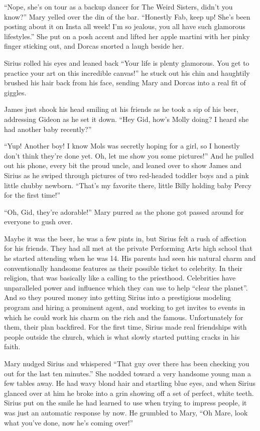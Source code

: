 \documentclass[12pt,twoside,openright]{memoir}
\begin{document}
``Nope, she's on tour as a backup dancer for The Weird Sisters, didn't you know?'' Mary yelled over the din of the bar.
``Honestly Fab, keep up! She's been posting about it on Insta all week! I'm so jealous, you all have such glamorous lifestyles.'' She put on a posh accent and lifted her apple martini with her pinky finger sticking out, and Dorcas snorted a laugh beside her. 

Sirius rolled his eyes and leaned back ``Your life is plenty glamorous. You get to practice your art on this incredible canvas!'' he stuck out his chin and haughtily brushed his hair back from his face, sending Mary and Dorcas into a real fit of giggles. 

James just shook his head smiling at his friends as he took a sip of his beer, addressing Gideon as he set it down. ``Hey Gid, how's Molly doing? I heard she had another baby recently?'' 

``Yup! Another boy! I know Mols was secretly hoping for a girl, so I honestly don't think they're done yet. Oh, let me show you some pictures!'' And he pulled out his phone, every bit the proud uncle, and leaned over to show James and Sirius as he swiped through pictures of two red-headed toddler boys and a pink little chubby newborn. ``That's my favorite there, little Billy holding baby Percy for the first time!'' 

``Oh, Gid, they're adorable!'' Mary purred as the phone got passed around for everyone to gush over. 

Maybe it was the beer, he was a few pints in, but Sirius felt a rush of affection for his friends. They had all met at the private Performing Arts high school that he started attending when he was 14. His parents had seen his natural charm and conventionally handsome features as their possible ticket to celebrity. In their religion, that was basically like a calling to the priesthood. Celebrities have unparalleled power and influence which they can use to help ``clear the planet''. And so they poured money into getting Sirius into a prestigious modeling program and hiring a prominent agent, and working to get invites to events in which he could work his charm on the rich and the famous. Unfortunately for them, their plan backfired. For the first time, Sirius made real friendships with people outside the church, which is what slowly started putting cracks in his faith. 

Mary nudged Sirius and whispered ``That guy over there has been checking you out for the last ten minutes.'' She nodded toward a very handsome young man a few tables away. He had wavy blond hair and startling blue eyes, and when Sirius glanced over at him he broke into a grin showing off a set of perfect, white teeth. Sirius put on the smile he had learned to use when trying to impress people, it was just an automatic response by now. He grumbled to Mary, ``Oh Mare, look what you've done, now he's coming over!''
\end{document}
